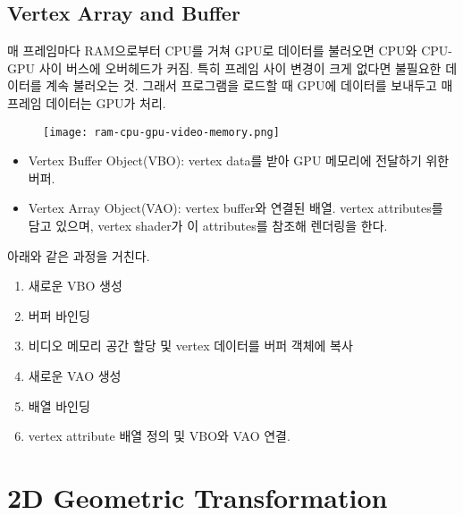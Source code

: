 \subsection{Vertex Array and Buffer}

매 프레임마다 RAM으로부터 CPU를 거쳐 GPU로 데이터를 불러오면 CPU와 CPU-GPU 사이 버스에 오버헤드가 커짐. 특히 프레임 사이 변경이 크게 없다면 불필요한 데이터를 계속 불러오는 것. 그래서 프로그램을 로드할 때 GPU에 데이터를 보내두고 매 프레임 데이터는 GPU가 처리.

\begin{figure}[h]
  \centering
  \texttt{[image: ram-cpu-gpu-video-memory.png]}
\end{figure}

\begin{itemize}
  \item Vertex Buffer Object(VBO): vertex data를 받아 GPU 메모리에 전달하기 위한 버퍼.
  \item Vertex Array Object(VAO): vertex buffer와 연결된 배열. vertex attributes를 담고 있으며, vertex shader가 이 attributes를 참조해 렌더링을 한다.
\end{itemize}

아래와 같은 과정을 거친다.

\begin{enumerate}
  \item 새로운 VBO 생성
  \item 버퍼 바인딩
  \item 비디오 메모리 공간 할당 및 vertex 데이터를 버퍼 객체에 복사
  \item 새로운 VAO 생성
  \item 배열 바인딩
  \item vertex attribute 배열 정의 및 VBO와 VAO 연결.
\end{enumerate}

\section{2D Geometric Transformation}

